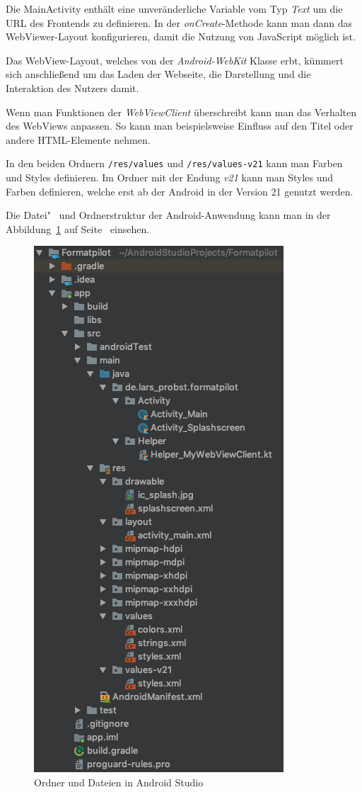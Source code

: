 Die MainActivity enthält eine unveränderliche Variable vom Typ \textit{Text} um die URL des Frontends zu definieren. In
der \textit{onCreate}-Methode kann man dann das WebViewer-Layout konfigurieren, damit die Nutzung von JavaScript möglich
ist.

Das WebView-Layout, welches von der \textit{Android-WebKit} Klasse erbt, kümmert sich anschließend um das Laden der
Webseite, die Darstellung und die Interaktion des Nutzers damit.

Wenn man Funktionen der \textit{WebViewClient} überschreibt kann man das Verhalten des WebViews anpassen. So kann man
beispielsweise Einfluss auf den Titel oder andere HTML-Elemente nehmen.

In den beiden Ordnern \texttt{/res/values} und \texttt{/res/values-v21} kann man Farben und Styles definieren. Im Ordner
mit der Endung \textit{v21} kann man Styles und Farben definieren, welche erst ab der Android in der Version 21 genutzt
werden.

Die Datei"~ und Ordnerstruktur der Android-Anwendung kann man in der Abbildung~\ref{fig:umsetzung_android_folder} auf
Seite~\pageref{fig:umsetzung_android_folder} einsehen.

\begin{figure}[h]
    \centering
    \includegraphics[scale=0.3]{images/kapitel_4/android_folder.png}
    \caption{Ordner und Dateien in Android Studio}
    \label{fig:umsetzung_android_folder}
\end{figure}

